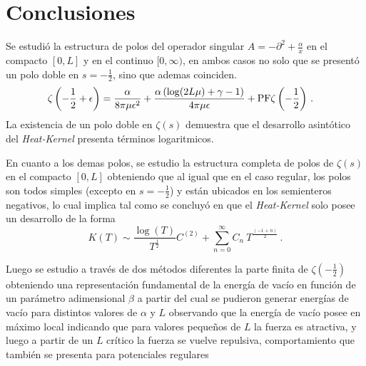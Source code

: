 \chapter{Conclusiones}

Se estudió la estructura de polos del operador singular $A = - \partial ^2 + \frac{\alpha}{x} $ en el compacto $[0,L]$ y en el continuo $[0, \infty)$, en ambos casos no solo que se presentó un polo doble en $s= -\frac{1}{2}$, sino que ademas coinciden.
\begin{align*}
&
	\zeta \left( - \frac{1}{2} + \epsilon \right) = 
	\frac{\alpha}{8 \pi \mu  \epsilon  ^2} +
	\frac{\alpha \left( \log (2 L \mu ) + \gamma -1  \right)}{4 \pi \mu  \epsilon } +
	{\rm PF } \zeta \left( - \frac{1}{2} \right)
\, .
\end{align*}
La existencia de un polo doble en $\zeta (s)$ demuestra que el desarrollo asintótico del {\it Heat-Kernel} presenta términos logaritmicos.

En cuanto a los demas polos, se estudio la estructura completa de polos de $\zeta \left(s \right)$ en el compacto $[0,L]$ obteniendo que al igual que en el caso regular, los polos son todos simples (excepto en $s= - \frac{1}{2}$) y están ubicados en los semienteros negativos, lo cual implica tal como se concluyó en \cite{Callias1980} que el {\it Heat-Kernel} solo posee un desarrollo de la forma  
\begin{equation}
	K(T) \sim 
	\frac{ \log (T)}{T ^{\frac{1}{2} }} C ^{(2)} +
	\sum _{n=0} ^{\infty}
	C _n  \ 
	T^{\frac{(-1+n)}{2}} 
\, .
\end{equation}


Luego se estudio a través de dos métodos diferentes la parte finita de $\zeta \left( - \frac{1}{2} \right)$ obteniendo una representación fundamental de la energía de vacío en función de un parámetro adimensional $\beta$ a partir del cual se pudieron generar energías de vacío para distintos valores de $\alpha$ y $L$ observando que la energía de vacío posee en máximo local indicando que para valores pequeños de $L$ la fuerza es atractiva, y luego a partir de un $L$ crítico la fuerza se vuelve repulsiva, comportamiento que también se presenta para potenciales regulares \cite{Beauregard_2013}



